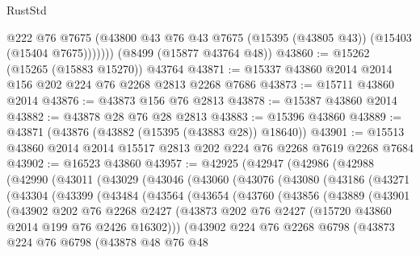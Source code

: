 \begin{lexlean}{RustStd}
\begin{coremodule}
            @222
            @76
            @7675
            (@43800 @43 @76 @43 @7675 (@15395 (@43805 @43)) (@15403 (@15404 @7675)))))))
    (@8499 (@15877 @43764 @48))
@43860 := @15262 (@15265 (@15883 @15270)) @43764
@43871 := @15337 @43860 @2014 @2014 @156 @202 @224 @76 @2268 @2813 @2268 @7686
@43873 := @15711 @43860 @2014
@43876 := @43873 @156 @76 @2813
@43878 := @15387 @43860 @2014
@43882 := @43878 @28 @76 @28 @2813
@43883 := @15396 @43860
@43889 := @43871 (@43876 (@43882 (@15395 (@43883 @28)) @18640))
@43901 := @15513 @43860 @2014 @2014 @15517 @2813 @202 @224 @76 @2268 @7619 @2268 @7684
@43902 := @16523 @43860
@43957 := @42925
    (@42947
      (@42986
        (@42988
          (@42990
            (@43011
              (@43029
                (@43046
                  (@43060
                    (@43076
                      (@43080
                        (@43186
                          (@43271
                            (@43304
                              (@43399
                                (@43484
                                  (@43564
                                    (@43654
                                      (@43760
                                        (@43856
                                          (@43889
                                            (@43901
                                              (@43902
                                                @202
                                                @76
                                                @2268
                                                @2427
                                                (@43873
                                                  @202
                                                  @76
                                                  @2427
                                                  (@15720 @43860 @2014 @199 @76 @2426 @16302)))
                                              (@43902
                                                @224
                                                @76
                                                @2268
                                                @6798
                                                (@43873
                                                  @224
                                                  @76
                                                  @6798
                                                  (@43878
                                                    @48
                                                    @76
                                                    @48

\end{coremodule}
\end{lexlean}
